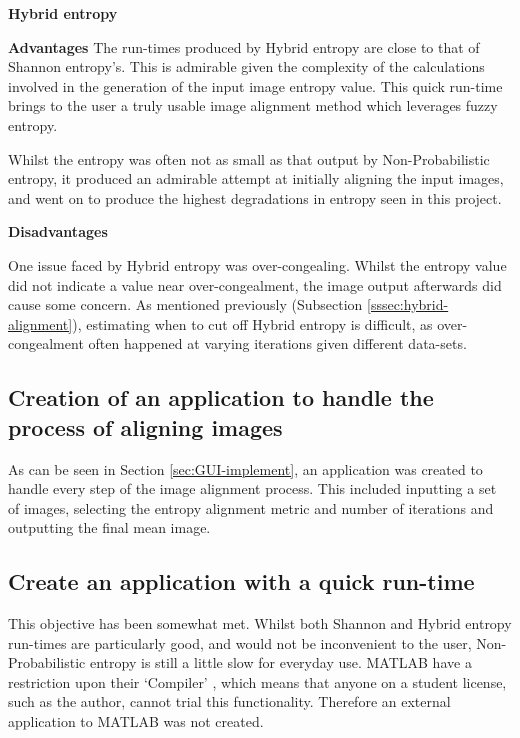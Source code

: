 \vspace{1cm}
\noindent \textbf{Hybrid entropy}

\noindent \textbf{Advantages}
The run-times produced by Hybrid entropy are close to that of Shannon entropy's. This is admirable given the complexity of the calculations involved in the generation of the input image entropy value. This quick run-time brings to the user a truly usable image alignment method which leverages fuzzy entropy.

Whilst the entropy was often not as small as that output by Non-Probabilistic entropy, it produced an admirable attempt at initially aligning the input images, and went on to produce the highest degradations in entropy seen in this project.

\noindent \textbf{Disadvantages}

One issue faced by Hybrid entropy was over-congealing. Whilst the entropy value did not indicate a value near over-congealment, the image output afterwards did cause some concern. As mentioned previously (Subsection \ref{sssec:hybrid-alignment}), estimating when to cut off Hybrid entropy is difficult, as over-congealment often happened at varying iterations given different data-sets.

\subsection{Creation of an application to handle the process of aligning images}

As can be seen in Section \ref{sec:GUI-implement}, an application was created to handle every step of the image alignment process. This included inputting a set of images, selecting the entropy alignment metric and number of iterations and outputting the final mean image.

\subsection{Create an application with a quick run-time}

This objective has been somewhat met. Whilst both Shannon and Hybrid entropy run-times are particularly good, and would not be inconvenient to the user, Non-Probabilistic entropy is still a little slow for everyday use. MATLAB have a restriction upon their `Compiler' \cite{compiler}, which means that anyone on a student license, such as the author, cannot trial this functionality. Therefore an external application to MATLAB was not created.

